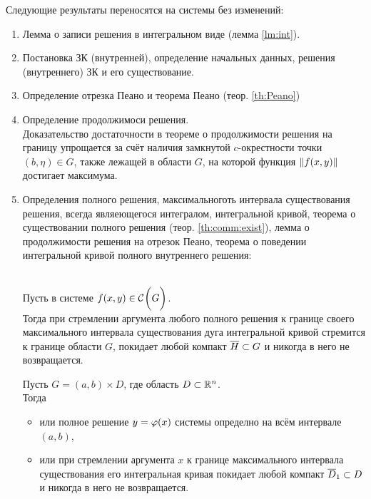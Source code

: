Следующие результаты переносятся на системы без изменений:
\begin{enumerate}
    \item Лемма о записи решения в интегральном виде (лемма \ref{lm:int}).
    \item Постановка ЗК (внутренней), определение начальных данных, решения (внутреннего) ЗК и его существование.
    \item Определение отрезка Пеано и теорема Пеано (теор. \ref{th:Peano})
    \item Определение продолжимоси решения. \\
    Доказательство достаточности в теореме о продолжимости решения на границу упрощается за счёт наличия замкнутой $ c $-окрестности точки $ (b, \eta) \in G $, также лежащей в области $ G $, на которой функция $ \left\|{f(x, y)}\right\| $ достигает максимума.
    \item Определения полного решения, максимальноготь интервала существования решения, всегда являеющегося интегралом, интегральной кривой, теорема о существовании полного решения (теор. \ref{th:comm:exist}), лемма о продолжимости решения на отрезок Пеано, теорема о поведении интегральной кривой полного внутреннего решения:
    \begin{theorem}
        \hfill \\
        Пусть в системе  $ f(x, y) \in \mathcal{C}^{} \bigg( {G} \bigg)  $. \\
        Тогда при стремлении аргумента любого полного решения к границе своего максимального интервала существования дуга интегральной кривой стремится к границе области $ G $, \ie покидает любой компакт $ \overline H \subset G $ и никогда в него не возвращается.
    \end{theorem}

    \begin{implication}
    	Пусть $ G = (a, b) \times D $, где область $ D \subset \mathbb{R}^n $. \\
        Тогда
        \begin{itemize}
            \item или полное решение $ y = \varphi(x) $ системы  определно на всём интервале $ (a ,b) $,
            \item или при стремлении аргумента $ x $ к границе максимального интервала существования его интегральная кривая покидает любой компакт $ \overline{D}_1 \subset D $ и никогда в него не возвращается.
        \end{itemize}
    \end{implication}


\end{enumerate}
